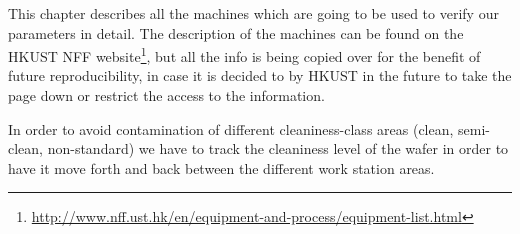 This chapter describes all the machines which are going to be used to verify our parameters in detail.
The description of the machines can be found on the HKUST NFF website\footnote{\url{http://www.nff.ust.hk/en/equipment-and-process/equipment-list.html}}, but all the info is being copied over for the benefit of future reproducibility, in case it is decided to by HKUST in the future to take the page down or restrict the access to the information.

In order to avoid contamination of different cleaniness-class areas (clean, semi-clean, non-standard) we have to track the cleaniness level of the wafer in order to have it move forth and back between the different work station areas.

